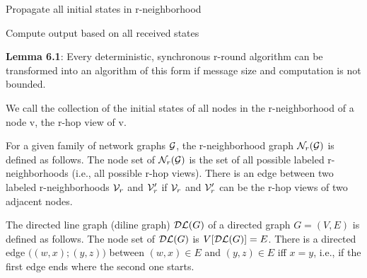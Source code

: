 

{
\begin{items}
    \item Propagate all initial states in r-neighborhood
    \item Compute output based on all received states
    \item {\bf Lemma 6.1}: Every deterministic, synchronous r-round algorithm
    can be transformed into an algorithm of this form if message size and
    computation is not bounded.
\end{items}
}

{
    We call the collection of the initial states of all nodes in the
    r-neighborhood of a node v, the r-hop view of v.
}


{
    For a given family of network graphs $\mathcal{G}$, the r-neighborhood graph
    $\mathcal{N}_r(\mathcal{G})$ is defined as follows. The node set of $\mathcal{N}_r(\mathcal{G})$
    is the set of all possible labeled r-neighborhoods (i.e., all possible r-hop
    views).
    There is an edge between two labeled r-neighborhoods $\mathcal{V}_r$ and
    $\mathcal{V}'_r$ if $\mathcal{V}_r$ and $\mathcal{V}'_r$ can be the r-hop views of two
    adjacent nodes.
}



{
    The directed line graph (diline graph) $\mathcal{DL}(G)$ of a directed graph $G =
    (V, E)$ is defined as follows. The node set of $\mathcal{DL}(G)$ is
    $V[\mathcal{DL}(G)] = E$. There is a directed edge $\big((w, x); (y, z)\big)$
    between $(w, x) \in E$ and $(y, z) \in E$ iff $x = y$, i.e., if the first
    edge ends where the second one starts.
}

